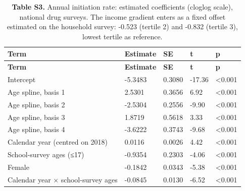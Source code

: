 \footnotesize
\begin{longtable}{lllll}
\caption{\textbf{Table S3.} Annual initiation rate: estimated coefficients (cloglog scale), national drug surveys. The income gradient enters as a fixed offset estimated on the household survey: -0.523 (tertile 2) and -0.832 (tertile 3), lowest tertile as reference.}\\
\toprule
\textbf{Term} & \textbf{Estimate} & \textbf{SE} & \textbf{t} & \textbf{p} \\
\midrule
\endfirsthead
\toprule
\textbf{Term} & \textbf{Estimate} & \textbf{SE} & \textbf{t} & \textbf{p} \\
\midrule
\endhead
\bottomrule
\endfoot
Intercept & -5.3483 & 0.3080 & -17.36 & <0.001 \\
Age spline, basis 1 & 2.5301 & 0.3656 & 6.92 & <0.001 \\
Age spline, basis 2 & -2.5304 & 0.2556 & -9.90 & <0.001 \\
Age spline, basis 3 & 1.8719 & 0.5618 & 3.33 & <0.001 \\
Age spline, basis 4 & -3.6222 & 0.3743 & -9.68 & <0.001 \\
Calendar year (centred on 2018) & 0.0116 & 0.0026 & 4.42 & <0.001 \\
School-survey ages (≤17) & -0.9354 & 0.2303 & -4.06 & <0.001 \\
Female & -0.1842 & 0.0343 & -5.38 & <0.001 \\
Calendar year × school-survey ages & -0.0845 & 0.0130 & -6.52 & <0.001 \\
\end{longtable}
\normalsize
